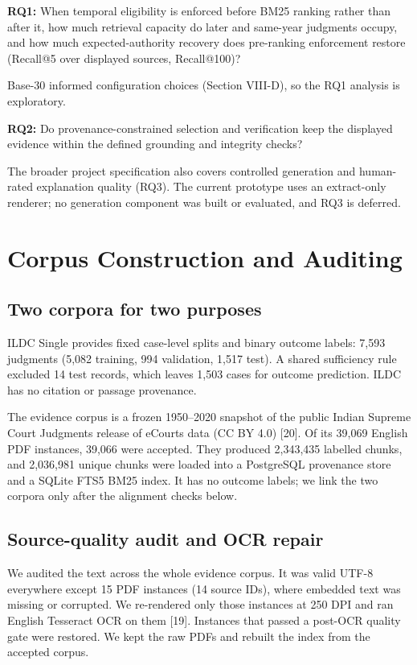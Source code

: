 \documentclass[conference]{IEEEtran}
\begin{document}
\textbf{RQ1:} When temporal eligibility is enforced before BM25 ranking rather than after it, how much retrieval capacity do later and same-year judgments occupy, and how much expected-authority recovery does pre-ranking enforcement restore (Recall@5 over displayed sources, Recall@100)?

Base-30 informed configuration choices (Section VIII-D), so the RQ1 analysis is exploratory.

\textbf{RQ2:} Do provenance-constrained selection and verification keep the displayed evidence within the defined grounding and integrity checks?

The broader project specification also covers controlled generation and human-rated explanation quality (RQ3). The current prototype uses an extract-only renderer; no generation component was built or evaluated, and RQ3 is deferred.

\section{Corpus Construction and Auditing}
\subsection{Two corpora for two purposes}
ILDC Single provides fixed case-level splits and binary outcome labels: 7,593 judgments (5,082 training, 994 validation, 1,517 test). A shared sufficiency rule excluded 14 test records, which leaves 1,503 cases for outcome prediction. ILDC has no citation or passage provenance.

The evidence corpus is a frozen 1950--2020 snapshot of the public Indian Supreme Court Judgments release of eCourts data (CC BY 4.0) [20]. Of its 39,069 English PDF instances, 39,066 were accepted. They produced 2,343,435 labelled chunks, and 2,036,981 unique chunks were loaded into a PostgreSQL provenance store and a SQLite FTS5 BM25 index. It has no outcome labels; we link the two corpora only after the alignment checks below.

\subsection{Source-quality audit and OCR repair}
We audited the text across the whole evidence corpus. It was valid UTF-8 everywhere except 15 PDF instances (14 source IDs), where embedded text was missing or corrupted. We re-rendered only those instances at 250 DPI and ran English Tesseract OCR on them [19]. Instances that passed a post-OCR quality gate were restored. We kept the raw PDFs and rebuilt the index from the accepted corpus.
\end{document}
